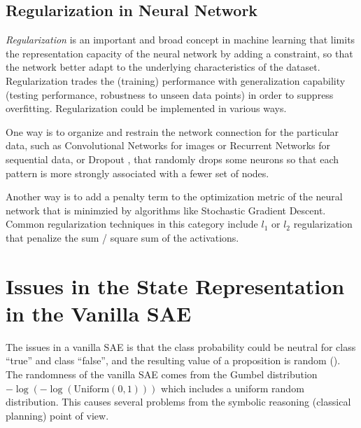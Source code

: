 \subsection{Regularization in Neural Network}

\emph{Regularization} is an important and broad concept in machine learning
that limits the representation capacity of the neural network by adding a constraint,
so that the network better adapt to the underlying characteristics of the dataset.
Regularization trades the (training) performance with generalization capability (testing performance, robustness to
unseen data points) in order to suppress overfitting.
Regularization could be implemented in various ways.

One way is to organize and restrain the network connection for the particular data,
such as Convolutional Networks for images
or Recurrent Networks for sequential data, or
Dropout \cite{srivastava2014dropout}, that randomly drops some neurons so
that each pattern is more strongly associated with a fewer set of nodes.

Another way is to add a penalty term to the optimization metric of the
neural network that is minimzied by algorithms like Stochastic
Gradient Descent.
Common regularization techniques in this category include
$l_1$ or $l_2$ regularization that penalize the sum / square sum of the
activations.



\section{Issues in the State Representation in the Vanilla SAE}
\label{issues}

The issues in a vanilla SAE is that the class probability could be
neutral for class ``true'' and class ``false'', and the resulting value
of a proposition is random ().
The randomness of the vanilla SAE comes from
the Gumbel distribution $-\log (-\log (\text{Uniform}(0,1)))$ which includes
a uniform random distribution.
This causes several problems from the symbolic reasoning (classical planning) point of view.

